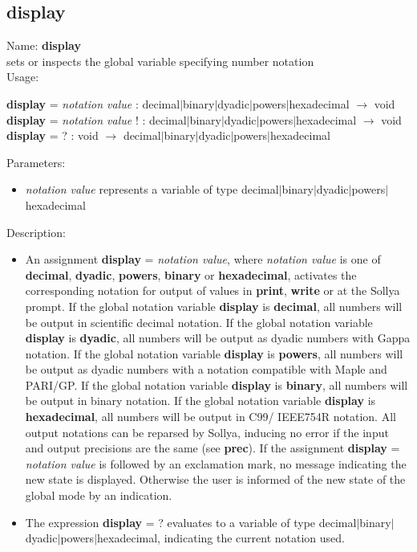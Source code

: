 \subsection{display}
\label{labdisplay}
\noindent Name: \textbf{display}\\
sets or inspects the global variable specifying number notation\\

\noindent Usage: 
\begin{center}
\textbf{display} = \emph{notation value} : \textsf{decimal$|$binary$|$dyadic$|$powers$|$hexadecimal} $\rightarrow$ \textsf{void}\\
\textbf{display} = \emph{notation value} ! : \textsf{decimal$|$binary$|$dyadic$|$powers$|$hexadecimal} $\rightarrow$ \textsf{void}\\
\textbf{display} = ? : \textsf{void} $\rightarrow$ \textsf{decimal$|$binary$|$dyadic$|$powers$|$hexadecimal}\\
\end{center}
Parameters: 
\begin{itemize}
\item \emph{notation value} represents a variable of type \textsf{decimal$|$binary$|$dyadic$|$powers$|$hexadecimal}
\end{itemize}
\noindent Description: \begin{itemize}

\item An assignment \textbf{display} = \emph{notation value}, where \emph{notation value} is
   one of \textbf{decimal}, \textbf{dyadic}, \textbf{powers}, \textbf{binary} or \textbf{hexadecimal}, activates
   the corresponding notation for output of values in \textbf{print}, \textbf{write} or
   at the Sollya prompt.
   If the global notation variable \textbf{display} is \textbf{decimal}, all numbers will
   be output in scientific decimal notation.  If the global notation
   variable \textbf{display} is \textbf{dyadic}, all numbers will be output as dyadic
   numbers with Gappa notation.  If the global notation variable \textbf{display}
   is \textbf{powers}, all numbers will be output as dyadic numbers with a
   notation compatible with Maple and PARI/GP.  If the global notation
   variable \textbf{display} is \textbf{binary}, all numbers will be output in binary
   notation.  If the global notation variable \textbf{display} is \textbf{hexadecimal},
   all numbers will be output in C99/ IEEE754R notation.  All output
   notations can be reparsed by Sollya, inducing no error if the input
   and output precisions are the same (see \textbf{prec}).
   If the assignment \textbf{display} = \emph{notation value} is followed by an
   exclamation mark, no message indicating the new state is
   displayed. Otherwise the user is informed of the new state of the
   global mode by an indication.

\item The expression \textbf{display} = ? evaluates to a variable of type
   \textsf{decimal$|$binary$|$dyadic$|$powers$|$hexadecimal}, indicating the current notation used.
\end{itemize}

